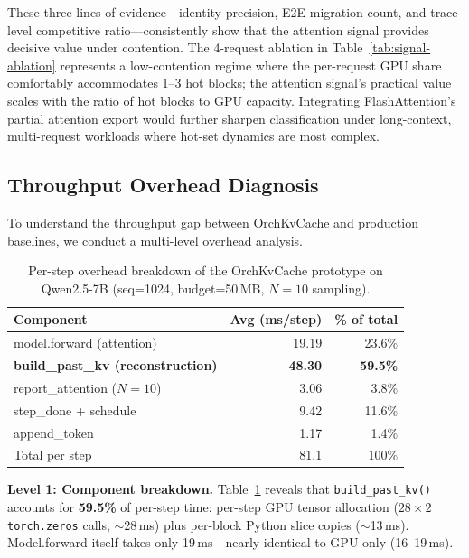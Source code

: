 \documentclass[conference]{IEEEtran}
\begin{document}
These three lines of evidence---identity precision, E2E migration count, and trace-level competitive ratio---consistently show that the attention signal provides decisive value under contention. The 4-request ablation in Table~\ref{tab:signal-ablation} represents a low-contention regime where the per-request GPU share comfortably accommodates 1--3 hot blocks; the attention signal's practical value scales with the ratio of hot blocks to GPU capacity. Integrating FlashAttention's partial attention export would further sharpen classification under long-context, multi-request workloads where hot-set dynamics are most complex.

\subsection{Throughput Overhead Diagnosis}
\label{sec:overhead}

To understand the throughput gap between OrchKvCache and production baselines, we conduct a multi-level overhead analysis.

\begin{table}[t]
\centering
\caption{Per-step overhead breakdown of the OrchKvCache prototype on Qwen2.5-7B (seq=1024, budget=50\,MB, $N{=}10$ sampling).}
\label{tab:overhead-breakdown}
\small
\setlength{\tabcolsep}{9pt}
\begin{tabular}{@{}lrr@{}}
\toprule
Component & Avg (ms/step) & \% of total \\
\midrule
model.forward (attention) & 19.19 & 23.6\% \\
\textbf{build\_past\_kv (reconstruction)} & \textbf{48.30} & \textbf{59.5\%} \\
report\_attention ($N{=}10$) & 3.06 & 3.8\% \\
step\_done + schedule & 9.42 & 11.6\% \\
append\_token & 1.17 & 1.4\% \\
\midrule
Total per step & 81.1 & 100\% \\
\bottomrule
\end{tabular}
\end{table}

\textbf{Level 1: Component breakdown.} Table~\ref{tab:overhead-breakdown} reveals that \texttt{build\_past\_kv()} accounts for \textbf{59.5\%} of per-step time: per-step GPU tensor allocation ($28{\times}2$ \texttt{torch.zeros} calls, ${\sim}$28\,ms) plus per-block Python slice copies (${\sim}$13\,ms). Model.forward itself takes only 19\,ms---nearly identical to GPU-only (16--19\,ms).
\end{document}
